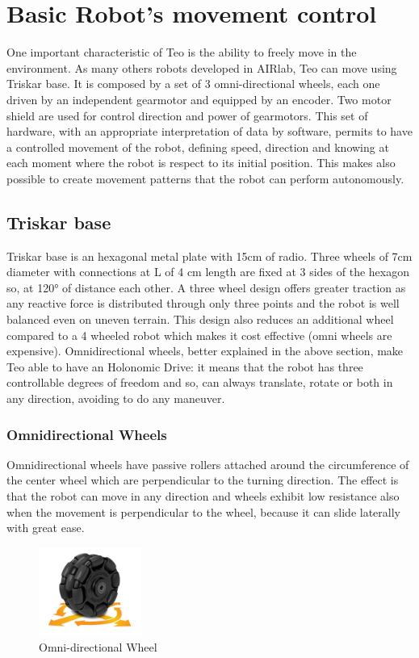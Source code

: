 \section{Basic Robot's movement control}
One important characteristic of Teo is the ability to freely move in the environment. As many others robots developed in AIRlab, Teo can move using Triskar base. It is composed by a set of 3 omni-directional wheels, each one driven by an independent gearmotor and equipped by an encoder. Two motor shield are used for control direction and power of gearmotors. This set of hardware, with an appropriate interpretation of data by software, permits to have a controlled movement of the robot, defining speed, direction and knowing at each moment where the robot is respect to its initial position. This makes also possible to create movement patterns that the robot can perform autonomously.
\subsection{Triskar base}
Triskar base is an hexagonal metal plate with 15cm of radio. Three wheels of 7cm diameter with connections at L of 4 cm length are fixed at 3 sides of the hexagon so, at \ang{120} of distance each other.
A three wheel design offers greater traction as any reactive force is distributed through only three points and the robot is well balanced even on uneven terrain. This design also reduces an additional wheel compared to a 4 wheeled robot which makes it cost effective (omni
wheels are expensive). Omnidirectional wheels, better explained in the above section, make Teo able to have an Holonomic Drive: it means that the robot has three controllable degrees of freedom and so, can always translate, rotate or both in any direction, avoiding to do any maneuver.
\subsubsection{Omnidirectional Wheels}
Omnidirectional wheels have passive rollers attached around the circumference of the center wheel which are perpendicular to the turning direction. The effect is that the robot can move in any direction and wheels  exhibit low resistance also when the movement is perpendicular to the wheel, because it can slide laterally with great ease.
\begin{figure}[h]
	\centering
	\includegraphics[width=0.3\textwidth]{omniwheel}
	\caption{Omni-directional Wheel}
	\label{fig:omniWheel}
\end{figure}
